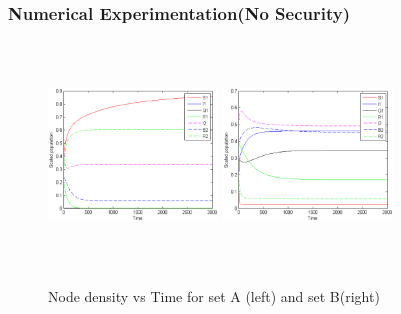 \documentclass{beamer}
\begin{document}
\begin{frame}\frametitle{Numerical Experimentation(No Security)}
\begin{figure}
  \centering
  \subfloat \label{fig:c}{\includegraphics[height=6cm,width=4.5cm]{13-DR10}}\qquad
  \subfloat \label{fig:d}{\includegraphics[height=6cm,width=4.5cm]{13-DR15}}
\caption{Node density vs Time for set A (left) and set B(right)}
\label{fig:2a}
\end{figure}

\end{frame}
\end{document}

